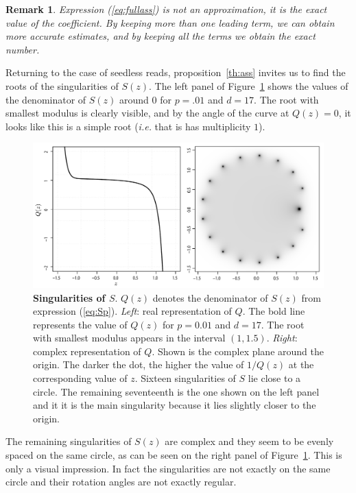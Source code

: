 \documentclass{article}
\newtheorem{remark}{Remark}
\begin{document}
\begin{remark}
Expression (\ref{eq:fullass}) is not an approximation, it is the exact
value of the coefficient. By keeping more than one leading term, we can
obtain more accurate estimates, and by keeping all the terms we obtain the
exact number.
\end{remark}

Returning to the case of seedless reads, proposition~\ref{th:ass} invites
us to find the roots of the singularities of $S(z)$. The left panel of
Figure~\ref{fig:plotQ} shows the values of the denominator of $S(z)$
around $0$ for $p=.01$ and $d=17$. The root with smallest modulus is
clearly visible, and by the angle of the curve at $Q(z) = 0$, it looks
like this is a simple root (\textit{i.e.} that is has multiplicity $1$).

\begin{figure}[h]
\centering
\includegraphics[scale=0.365]{singularityS.pdf}
\caption{\textbf{Singularities of $S$}. $Q(z)$ denotes the
denominator of $S(z)$ from expression (\ref{eq:Sp}). \textit{Left}: real
representation of $Q$. The bold line represents the value of $Q(z)$ for
$p=0.01$ and $d=17$. The root with smallest modulus appears in the
interval $(1, 1.5)$. \textit{Right}: complex representation of $Q$. Shown
is the complex plane around the origin. The darker the dot, the higher the
value of $1/Q(z)$ at the corresponding value of $z$. Sixteen singularities
of $S$ lie close to a circle. The remaining seventeenth is the one shown
on the left panel and it it is the main singularity because it lies
slightly closer to the origin.}
\label{fig:plotQ}
\end{figure}

The remaining singularities of $S(z)$ are complex and they seem to be
evenly spaced on the same circle, as can be seen on the right panel of
Figure~\ref{fig:plotQ}. This is only a visual impression. In fact the
singularities are not exactly on the same circle and their rotation angles
are not exactly regular.
\end{document}
